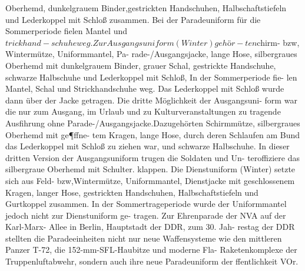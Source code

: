 Oberhemd, dunkelgrauem Binder,gestrickten
Handschuhen, Halbschaftstiefeln und Lederkoppel
mit Schloß zusammen. Bei der Paradeuniform für
die Sommerperiode fielen Mantel und $trickhand-
schuhe weg.Zur Ausgangsuniform (Winter) gehör-
ten $chirm- bzw, Wintermütze, Uniformmantel, Pa-
rade-/Ausgangsjacke, lange Hose, silbergraues
Oberhemd mit dunkelgrauem Binder, grauer Schal,
gestrickte Handschuhe, schwarze Halbschuhe und
Lederkoppel mit Schloß, In der Sommerperiode fie-
len Mantel, Schal und Strickhandschuhe weg. Das
Lederkoppel mit Schloß wurde dann über der Jacke getragen. Die dritte Möglichkeit der Ausgangsuni-
form war die nur zum Ausgang, im Urlaub und zu
Kulturveranstaltungen zu tragende Ausfihrung
ohne Parade-/Ausgangsjacke.Dazugehörten
Schirmmütze, silbergraues Oberhemd mit ge¶ffne-
tem Kragen, lange Hose, durch deren Schlaufen am
Bund das Lederkoppel mit Schloß zu ziehen war,
und schwarze Halbschuhe. In dieser dritten Version
der Ausgangsuniform trugen die Soldaten und Un-
teroffiziere das silbergraue Oberhemd mit Schulter.
klappen.
Die Dienstuniform (Winter) setzte sich aus Feld-
bzw,Wintermütze,
Uniformmantel, Dienstjacke mit geschlossenem Kragen, langer Hose, gestrickten
Handschuhen, Halbschaftstiefeln und Gurtkoppel
zusammen. In der Sommertrageperiode wurde der
Uniformmantel jedoch nicht zur Dienstuniform ge-
tragen.
Zur Ehrenparade der NVA auf der Karl-Marx-
Allee in Berlin, Hauptstadt der DDR, zum 30. Jah-
restag der DDR stellten die Paradeeinheiten nicht
nur neue Waffensysteme wie den mittleren Panzer
T-72, die 152-mm-SFL-Haubitze und moderne Fla-
Raketenkomplexe der Truppenluftabwehr, sondern
auch ihre neue Paradeuniform der ffentlichkeit
VOr.